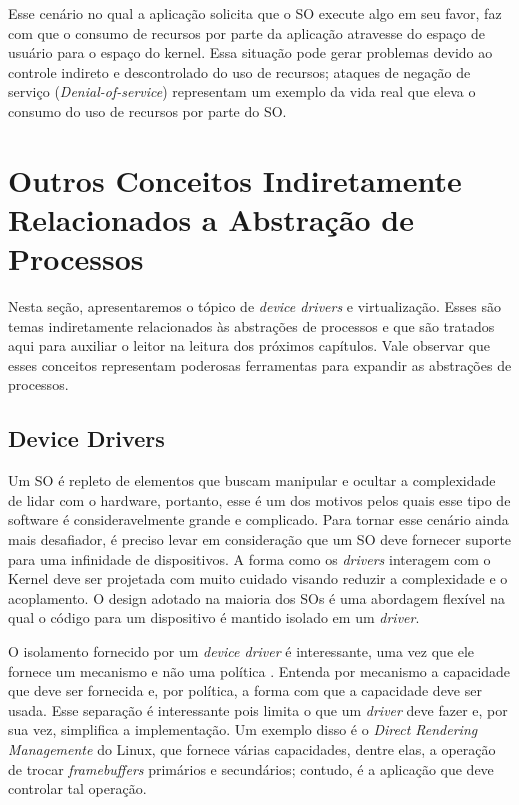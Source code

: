 Esse cenário no qual a aplicação solicita que o SO execute algo em seu favor,
faz com que o consumo de recursos por parte da aplicação atravesse do espaço de
usuário para o espaço do kernel. Essa situação pode gerar problemas devido ao
controle indireto e descontrolado do uso de recursos; ataques de negação de serviço
(\emph{Denial-of-service}) representam um exemplo da vida real que eleva o
consumo do uso de recursos por parte do SO.

\section{Outros Conceitos Indiretamente Relacionados a Abstração de Processos}

Nesta seção, apresentaremos o tópico de \emph{device drivers} e virtualização.
Esses são temas indiretamente relacionados às abstrações de processos e que são
tratados aqui para auxiliar o leitor na leitura dos próximos capítulos. Vale
observar que esses conceitos representam poderosas ferramentas para expandir as
abstrações de processos.

\subsection{Device Drivers}
\label{sec:dd}

Um SO é repleto de elementos que buscam manipular e ocultar a complexidade de
lidar com o hardware, portanto, esse é um dos motivos pelos quais esse tipo de
software é consideravelmente grande e complicado. Para tornar esse cenário
ainda mais desafiador, é preciso levar em consideração que um SO deve fornecer
suporte para uma infinidade de dispositivos. A forma como os \emph{drivers}
interagem com o Kernel deve ser projetada com muito cuidado visando reduzir a
complexidade e o acoplamento. O design adotado na maioria dos SOs é uma
abordagem flexível na qual o código para um dispositivo é mantido isolado em um
\emph{driver}.

O isolamento fornecido por um \emph{device driver} é interessante, uma vez que
ele fornece um mecanismo e não uma política \citep{ddbook}. Entenda por
mecanismo a capacidade que deve ser fornecida e, por política, a forma com
que a capacidade deve ser usada. Esse separação é interessante pois limita o
que um \emph{driver} deve fazer e, por sua vez, simplifica a implementação. Um
exemplo disso é o \emph{Direct Rendering Managemente} do Linux, que
fornece várias capacidades, dentre elas, a operação de trocar
\emph{framebuffers} primários e secundários; contudo, é a aplicação que deve
controlar tal operação.


